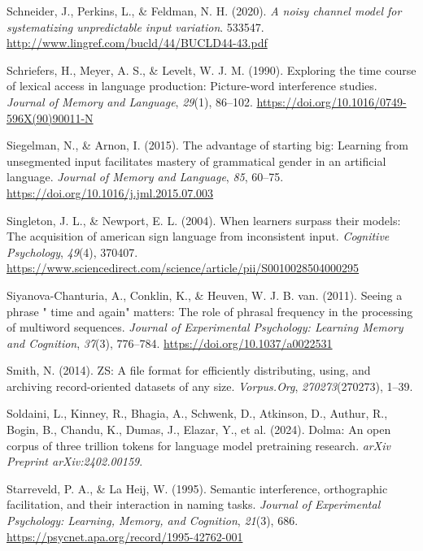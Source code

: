 \documentclass[
  12pt,
  letterpaper,
]{scrreprt}
\newlength{\cslhangindent}
\newenvironment{CSLReferences}[2] %
 {\begin{list}{}{%
  \setlength{\itemindent}{0pt}
  \setlength{\leftmargin}{0pt}
  \setlength{\parsep}{0pt}
  \ifodd #1
   \setlength{\leftmargin}{\cslhangindent}
   \setlength{\itemindent}{-1\cslhangindent}
  \fi
  \setlength{\itemsep}{#2\baselineskip}}}
 {\end{list}}
\begin{document}
\begin{CSLReferences}{1}{0}
Schneider, J., Perkins, L., \& Feldman, N. H. (2020). \emph{A noisy
channel model for systematizing unpredictable input variation}. 533547.
\url{http://www.lingref.com/bucld/44/BUCLD44-43.pdf}

Schriefers, H., Meyer, A. S., \& Levelt, W. J. M. (1990). Exploring the
time course of lexical access in language production: Picture-word
interference studies. \emph{Journal of Memory and Language},
\emph{29}(1), 86--102.
\url{https://doi.org/10.1016/0749-596X(90)90011-N}

Siegelman, N., \& Arnon, I. (2015). The advantage of starting big:
Learning from unsegmented input facilitates mastery of grammatical
gender in an artificial language. \emph{Journal of Memory and Language},
\emph{85}, 60--75. \url{https://doi.org/10.1016/j.jml.2015.07.003}

Singleton, J. L., \& Newport, E. L. (2004). When learners surpass their
models: The acquisition of american sign language from inconsistent
input. \emph{Cognitive Psychology}, \emph{49}(4), 370407.
\url{https://www.sciencedirect.com/science/article/pii/S0010028504000295}

Siyanova-Chanturia, A., Conklin, K., \& Heuven, W. J. B. van. (2011).
Seeing a phrase {"} time and again{"} matters: The role of phrasal
frequency in the processing of multiword sequences. \emph{Journal of
Experimental Psychology: Learning Memory and Cognition}, \emph{37}(3),
776--784. \url{https://doi.org/10.1037/a0022531}

Smith, N. (2014). ZS: A file format for efficiently distributing, using,
and archiving record-oriented datasets of any size. \emph{Vorpus.Org},
\emph{270273}(270273), 1--39.

Soldaini, L., Kinney, R., Bhagia, A., Schwenk, D., Atkinson, D., Authur,
R., Bogin, B., Chandu, K., Dumas, J., Elazar, Y., et al. (2024). Dolma:
An open corpus of three trillion tokens for language model pretraining
research. \emph{arXiv Preprint arXiv:2402.00159}.

Starreveld, P. A., \& La Heij, W. (1995). Semantic interference,
orthographic facilitation, and their interaction in naming tasks.
\emph{Journal of Experimental Psychology: Learning, Memory, and
Cognition}, \emph{21}(3), 686.
\url{https://psycnet.apa.org/record/1995-42762-001}


\end{CSLReferences}
\end{document}
